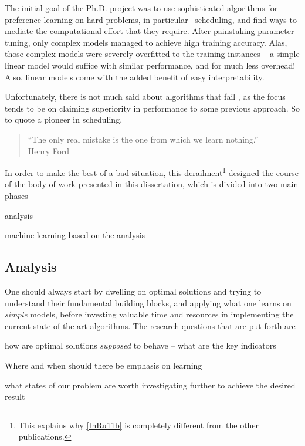 The initial goal of the Ph.D. project was to use sophisticated algorithms for 
preference learning on hard problems, in particular \jsp\ scheduling, and find 
ways to mediate the computational effort that they require.
After painstaking parameter tuning, only complex models managed to achieve  
high training accuracy. Alas, those complex models were severely overfitted to 
the training instances -- a simple linear model would suffice with similar 
performance, and for much less overhead! Also, linear models come with the 
added benefit of easy interpretability. 

Unfortunately, there is not much said about algorithms that fail 
\citep{SmithMiles2015}, as the focus tends to be on claiming superiority in 
performance to some previous approach.
So to quote a pioneer in scheduling, 
\begin{quote}
    ``The only real mistake is the one from which we learn nothing.'' \\
    \raggedleft Henry Ford
\end{quote}
In order to make the best of a bad situation, this derailment\footnote{
    This explains why \cref{InRu11b} is completely different from the other 
    publications.} 
designed the course of the body of work presented in this dissertation, which 
is divided into two main phases
\begin{enumerate*}
    \item analysis
    \item machine learning based on the analysis
\end{enumerate*} 

\subsection*{Analysis}
One should always start by dwelling on optimal solutions and trying to 
understand their fundamental building blocks, and applying what one learns on 
\emph{simple} models, before investing valuable time and resources in 
implementing the current state-of-the-art algorithms. 
The research questions that are put forth are
\begin{enumerate*}[itemjoin={{? }}, itemjoin*={{? And ultimately, }},
    after={{?}}]
    \item how are optimal solutions \emph{supposed} to behave -- what are the 
    key indicators
    \item Where and when should there be emphasis on learning
    \item what states of our problem are worth investigating further to achieve 
    the desired result
\end{enumerate*}

